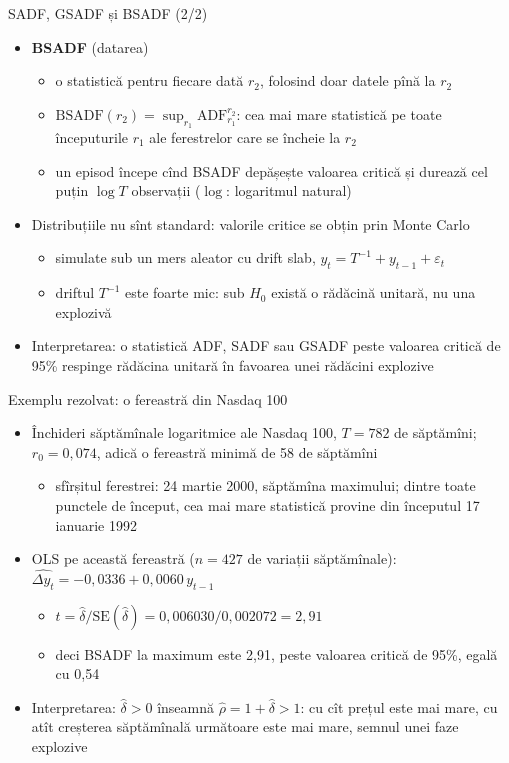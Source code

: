 \begin{frame}{SADF, GSADF și BSADF (2/2)}
\itemsize{\small}
\begin{itemize}
    \item \textbf{BSADF} (datarea)
    \begin{itemize}
        \item o statistică pentru fiecare dată $r_2$, folosind doar datele pînă la $r_2$
        \item $\mathrm{BSADF}(r_2) = \sup_{r_1} \mathrm{ADF}_{r_1}^{r_2}$: cea mai mare statistică pe toate începuturile $r_1$ ale ferestrelor care se încheie la $r_2$
        \item un episod începe cînd BSADF depășește valoarea critică și durează cel puțin $\log T$ observații  ($\log$: logaritmul natural)
    \end{itemize}
    \item Distribuțiile nu sînt standard: valorile critice se obțin prin Monte Carlo
    \begin{itemize}
        \item simulate sub un mers aleator cu drift slab, $y_t = T^{-1} + y_{t-1} + \varepsilon_t$
        \item driftul $T^{-1}$ este foarte mic: sub $H_0$ există o rădăcină unitară, nu una explozivă
    \end{itemize}
    \item Interpretarea: o statistică ADF, SADF sau GSADF peste valoarea critică de 95\% respinge rădăcina unitară în favoarea unei rădăcini explozive
\end{itemize}
\end{frame}

\begin{frame}{Exemplu rezolvat: o fereastră din Nasdaq 100}
\itemsize{\small}
\begin{itemize}
    \item Închideri săptămînale logaritmice ale Nasdaq 100, $T = 782$ de săptămîni; $r_0 = 0{,}074$, adică o fereastră minimă de 58 de săptămîni
    \begin{itemize}
        \item sfîrșitul ferestrei: 24 martie 2000, săptămîna maximului; dintre toate punctele de început, cea mai mare statistică provine din începutul 17 ianuarie 1992
    \end{itemize}
    \item OLS pe această fereastră ($n = 427$ de variații săptămînale): $\widehat{\Delta y_t} = -0{,}0336 + 0{,}0060\, y_{t-1}$
    \begin{itemize}
        \item $t = \hat\delta / \mathrm{SE}(\hat\delta) = 0{,}006030 / 0{,}002072 = 2{,}91$
        \item deci BSADF la maximum este 2{,}91, peste valoarea critică de 95\%, egală cu 0{,}54
    \end{itemize}
    \item Interpretarea: $\hat\delta > 0$ înseamnă $\hat\rho = 1 + \hat\delta > 1$: cu cît prețul este mai mare, cu atît creșterea săptămînală următoare este mai mare, semnul unei faze explozive
\end{itemize}
\end{frame}

